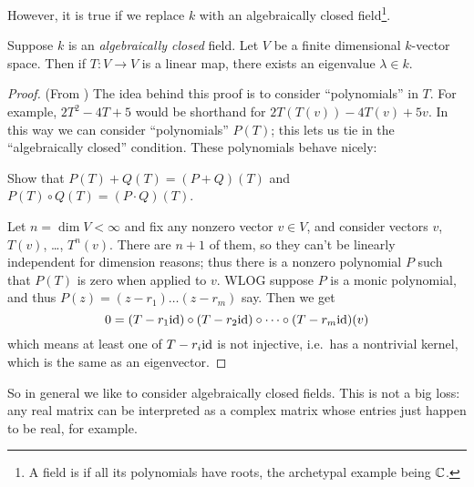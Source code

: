 However, it is true if we replace $k$ with an
algebraically closed field\footnote{A field is 
	if all its polynomials have roots,
	the archetypal example being $\mathbb C$.}.
\begin{theorem}
	Suppose $k$ is an \emph{algebraically closed} field.
	Let $V$ be a finite dimensional $k$-vector space.
	Then if $T \colon V \to V$ is a linear map,
	there exists an eigenvalue $\lambda \in k$.
\end{theorem}
\begin{proof}
	(From \cite{ref:axler})
	The idea behind this proof is to consider ``polynomials'' in $T$.
	For example, $2T^2-4T+5$ would be shorthand for $2T(T(v)) - 4T(v) + 5v$.
	In this way we can consider ``polynomials'' $P(T)$;
	this lets us tie in the ``algebraically closed'' condition.
	These polynomials behave nicely:
	\begin{ques}
		Show that $P(T)+Q(T) = (P+Q)(T)$ and $P(T) \circ Q(T) = (P \cdot Q)(T)$.
	\end{ques}

	Let $n = \dim V < \infty$ and fix any nonzero vector $v \in V$,
	and consider vectors $v$, $T(v)$, \dots, $T^n (v)$.
	There are $n+1$ of them,
	so they can't be linearly independent for dimension reasons;
	thus there is a nonzero polynomial $P$ such that $P(T)$
	is zero when applied to $v$.
	WLOG suppose $P$ is a monic polynomial,
	and thus $P(z) = (z-r_1)\dots(z-r_m)$ say.
	Then we get
	\[ 0 = (T - r_1 \mathrm{id}) \circ (T - r_2 \mathrm{id}) \circ \dots
		\circ (T - r_m \mathrm{id})(v) \]
	which means at least one of $T - r_i \mathrm{id}$ is not injective,
	i.e.\ has a nontrivial kernel,
	which is the same as an eigenvector.
\end{proof}
So in general we like to consider algebraically closed fields.
This is not a big loss:
any real matrix can be interpreted as a complex matrix
whose entries just happen to be real, for example.

